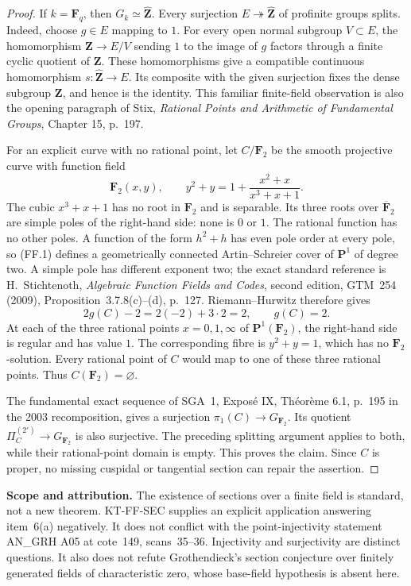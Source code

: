 \documentclass[11pt,a4paper]{article}
\theoremstyle{definition}
\renewcommand{\paragraph}[1]{\par\smallskip\noindent\textbf{#1}\quad\ignorespaces}
\begin{document}
\begin{proof}
If $k=\mathbf F_q$, then $G_k\simeq\widehat{\mathbf Z}$.
Every surjection $E\twoheadrightarrow\widehat{\mathbf Z}$ of
profinite groups splits. Indeed, choose $g\in E$ mapping to $1$.
For every open normal subgroup $V\subset E$, the homomorphism
$\mathbf Z\to E/V$ sending $1$ to the image of $g$ factors through
a finite cyclic quotient of $\mathbf Z$. These homomorphisms give
a compatible continuous homomorphism
$s:\widehat{\mathbf Z}\to E$. Its composite with the given
surjection fixes the dense subgroup $\mathbf Z$, and hence is the
identity. This familiar finite-field observation is also the opening
paragraph of Stix, \emph{Rational Points and Arithmetic of Fundamental
Groups}, Chapter 15, p.~197.

For an explicit curve with no rational point, let $C/\mathbf F_2$
be the smooth projective curve with function field
\[
 \mathbf F_2(x,y),\qquad
 y^2+y=1+\frac{x^2+x}{x^3+x+1}.                         \tag{FF.1}
\]
The cubic $x^3+x+1$ has no root in $\mathbf F_2$ and is separable.
Its three roots over $\overline{\mathbf F}_2$ are simple poles of
the right-hand side: none is $0$ or $1$. The rational function has
no other poles. A function of the form $h^2+h$ has even pole order
at every pole, so (FF.1) defines a geometrically connected
Artin--Schreier cover of $\mathbf P^1$ of degree two. A simple pole
has different exponent two; the exact standard reference is
H.~Stichtenoth, \emph{Algebraic Function Fields and Codes}, second
edition, GTM~254 (2009), Proposition~3.7.8(c)--(d), p.~127.
Riemann--Hurwitz therefore gives
\[
 2g(C)-2=2(-2)+3\cdot2=2,
 \qquad g(C)=2.
\]
At each of the three rational points $x=0,1,\infty$ of
$\mathbf P^1(\mathbf F_2)$, the right-hand side is regular and
has value $1$. The corresponding fibre is
$y^2+y=1$, which has no $\mathbf F_2$-solution. Every rational
point of $C$ would map to one of these three rational points.
Thus $C(\mathbf F_2)=\varnothing$.

The fundamental exact sequence of SGA~1, Expos\'e IX,
Th\'eor\`eme 6.1, p.~195 in the 2003 recomposition, gives a
surjection $\pi_1(C)\to G_{\mathbf F_2}$. Its quotient
$\Pi_C^{(2')}\to G_{\mathbf F_2}$ is also surjective. The
preceding splitting argument applies to both, while their
rational-point domain is empty. This proves the claim. Since
$C$ is proper, no missing cuspidal or tangential section can
repair the assertion.
\end{proof}

\paragraph{Scope and attribution.}
The existence of sections over a finite field is standard, not a
new theorem. KT-FF-SEC supplies an explicit application answering
item~6(a) negatively. It does not conflict with the point-injectivity
statement AN\_GRH A05 at cote~149, scans~35--36. Injectivity and
surjectivity are distinct questions. It also does not refute
Grothendieck's section conjecture over finitely generated fields of
characteristic zero, whose base-field hypothesis is absent here.
\end{document}
